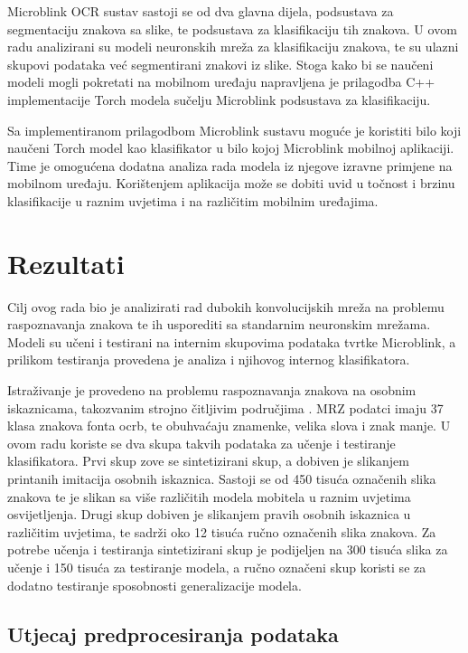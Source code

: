 \documentclass[lmodern, utf8, diplomski, numeric]{fer}
\begin{document}
Microblink OCR sustav sastoji se od dva glavna dijela, podsustava za segmentaciju znakova sa slike, te podsustava za klasifikaciju tih znakova. U ovom radu analizirani su modeli neuronskih mreža za klasifikaciju znakova, te su ulazni skupovi podataka već segmentirani znakovi iz slike. Stoga kako bi se naučeni modeli mogli pokretati na mobilnom uređaju napravljena je prilagodba C++ implementacije Torch modela sučelju Microblink podsustava za klasifikaciju.

Sa implementiranom prilagodbom Microblink sustavu moguće je koristiti bilo koji naučeni Torch model kao klasifikator u bilo kojoj Microblink mobilnoj aplikaciji. Time je omogućena dodatna analiza rada modela iz njegove izravne primjene na mobilnom uređaju. Korištenjem aplikacija može se dobiti uvid u točnost i brzinu klasifikacije u raznim uvjetima i na različitim mobilnim uređajima.  


\chapter{Rezultati}

Cilj ovog rada bio je analizirati rad dubokih konvolucijskih mreža na problemu raspoznavanja znakova te ih usporediti sa standarnim neuronskim mrežama. Modeli su učeni i testirani na internim skupovima podataka tvrtke Microblink, a prilikom testiranja provedena je analiza i njihovog internog klasifikatora. 

Istraživanje je provedeno na problemu raspoznavanja znakova na osobnim iskaznicama, takozvanim strojno čitljivim područjima . MRZ podatci imaju 37 klasa znakova fonta ocrb, te obuhvaćaju znamenke, velika slova i znak manje. U ovom radu koriste se dva skupa takvih podataka za učenje i testiranje klasifikatora. Prvi skup zove se sintetizirani skup, a dobiven je slikanjem printanih imitacija osobnih iskaznica. Sastoji se od 450 tisuća označenih slika znakova te je slikan sa više različitih modela mobitela u raznim uvjetima osvijetljenja. Drugi skup dobiven je slikanjem pravih osobnih iskaznica u različitim uvjetima, te sadrži oko 12 tisuća ručno označenih slika znakova. Za potrebe učenja i testiranja sintetizirani skup je podijeljen na 300 tisuća slika za učenje i 150 tisuća za testiranje modela, a ručno označeni skup koristi se za dodatno testiranje sposobnosti generalizacije modela.



\section{Utjecaj predprocesiranja podataka}
\end{document}
